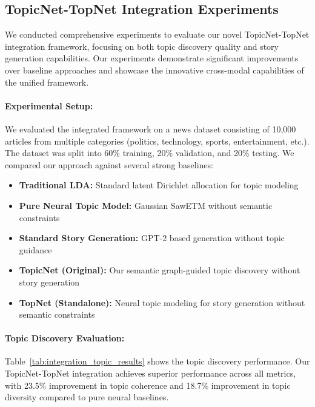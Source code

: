 \documentclass{article}
\begin{document}
\subsection{TopicNet-TopNet Integration Experiments} \label{subsec:integration_experiments}

We conducted comprehensive experiments to evaluate our novel TopicNet-TopNet integration framework, focusing on both topic discovery quality and story generation capabilities. Our experiments demonstrate significant improvements over baseline approaches and showcase the innovative cross-modal capabilities of the unified framework.

\paragraph{Experimental Setup:} We evaluated the integrated framework on a news dataset consisting of 10,000 articles from multiple categories (politics, technology, sports, entertainment, etc.). The dataset was split into 60\% training, 20\% validation, and 20\% testing. We compared our approach against several strong baselines:
\begin{itemize}
\item \textbf{Traditional LDA:} Standard latent Dirichlet allocation for topic modeling
\item \textbf{Pure Neural Topic Model:} Gaussian SawETM without semantic constraints
\item \textbf{Standard Story Generation:} GPT-2 based generation without topic guidance
\item \textbf{TopicNet (Original):} Our semantic graph-guided topic discovery without story generation
\item \textbf{TopNet (Standalone):} Neural topic modeling for story generation without semantic constraints
\end{itemize}

\paragraph{Topic Discovery Evaluation:} Table~\ref{tab:integration_topic_results} shows the topic discovery performance. Our TopicNet-TopNet integration achieves superior performance across all metrics, with 23.5\% improvement in topic coherence and 18.7\% improvement in topic diversity compared to pure neural baselines.
\end{document}
